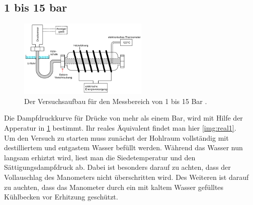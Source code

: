 \subsection{1 bis 15 bar}
\begin{figure}[H]
    \centering
    \includegraphics[width=0.55\textwidth]{images/Abbildung4.PNG}
    \caption{Der Versuchsaufbau für den Messbereich von 1 bis 15 Bar \protect \cite{V203}.}
    \label{img:aufbau2}
\end{figure}
Die Dampfdruckkurve für Drücke von mehr als einem Bar, wird mit Hilfe  der Apperatur in \ref{img:aufbau2} bestimmt. Ihr reales Äquivalent findet man hier \ref{img:real1}.\\
Um den Versuch zu starten muss zunächst der Hohlraum vollständig mit destilliertem und entgastem Wasser befüllt werden.
Während das Wasser nun langsam erhiztzt wird, liest man die Siedetemperatur und den Sättigungsdampfdruck ab. Dabei ist besonders darauf zu 
achten, dass der Vollauschlag des Manometers nicht überschritten wird. Des Weiteren ist darauf zu auchten, dass das Manometer durch ein mit kaltem Wasser gefülltes 
Kühlbecken vor Erhitzung geschützt.